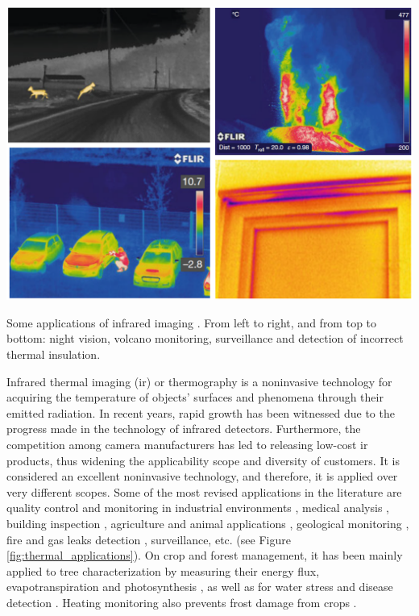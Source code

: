 \begin{marginfigure}[1.5cm]
    \centering
    \includegraphics{figs/fundamentals/thermal_applications.png}
    \caption{Some applications of infrared imaging \cite{vollmer_infrared_2017}. From left to right, and from top to bottom: night vision, volcano monitoring, surveillance and detection of incorrect thermal insulation.}
    \label{fig:thermal_applications}
\end{marginfigure}
Infrared thermal imaging (\acrshort{ir}) or thermography is a noninvasive technology for acquiring the temperature of objects' surfaces and phenomena through their emitted radiation. In recent years, rapid growth has been witnessed due to the progress made in the technology of infrared detectors. Furthermore, the competition among camera manufacturers has led to releasing low-cost \acrshort{ir} products, thus widening the applicability scope and diversity of customers. It is considered an excellent noninvasive technology, and therefore, it is applied over very different scopes. Some of the most revised applications in the literature are quality control and monitoring in industrial environments \cite{alfredo_osornio-rios_recent_2019, vollmer_infrared_2017}, medical analysis \cite{lorinczy_thermal_2017}, building inspection \cite{jarzabek-rychard_supervised_2020, kylili_infrared_2014}, agriculture and animal applications \cite{mcmanus_infrared_2016, tsouros_review_2019}, geological monitoring \cite{grechi_3d_2021}, fire and gas leaks detection \cite{gade_thermal_2014}, surveillance, etc. (see Figure \ref{fig:thermal_applications}). On crop and forest management, it has been mainly applied to tree characterization by measuring their energy flux, evapotranspiration and photosynthesis \cite{webster_three-dimensional_2018}, as well as for water stress and disease detection \cite{yandun_narvaez_survey_2017, de_oca_uas_2021, zarco-tejada_previsual_2018}. Heating monitoring also prevents frost damage from crops \cite{yuan_uav-based_2021}. 

